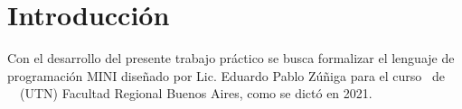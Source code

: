 
\section{Introducción}

Con el desarrollo del presente trabajo práctico se busca formalizar el lenguaje de programación MINI diseñado por Lic. Eduardo Pablo Zúñiga para el curso \course \ de \  \university \ (UTN) Facultad Regional Buenos Aires, como se dictó en 2021.
